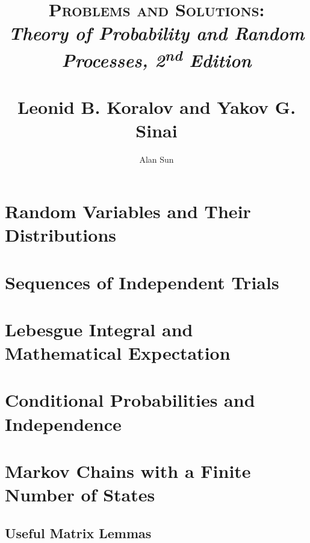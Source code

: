 \documentclass{report}
\title{\textsc{Problems and Solutions:} \\ 
\textit{Theory of Probability and Random Processes, 2\textsuperscript{nd} Edition} \\ 
~\\ \large Leonid B. Koralov and Yakov G. Sinai}
\author{Alan Sun}
\date{}
\begin{document}
\maketitle

\tableofcontents
\chapter{Random Variables and Their Distributions}

\chapter{Sequences of Independent Trials}

\chapter{Lebesgue Integral and Mathematical Expectation}

\chapter{Conditional Probabilities and Independence}


\chapter{Markov Chains with a Finite Number of States}



\begin{appendices}
\chapter{Useful Matrix Lemmas}

\end{appendices}
\end{document}
